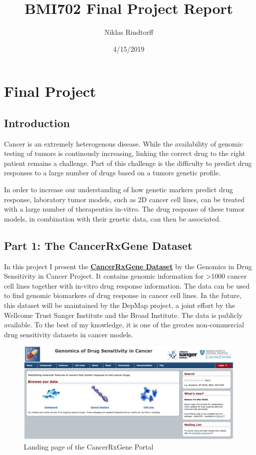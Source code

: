 \documentclass[]{article}
\title{BMI702 Final Project Report}
\author{Niklas Rindtorff}
\date{4/15/2019}
\begin{document}
\maketitle

\hypertarget{final-project}{%
\section{Final Project}\label{final-project}}

\hypertarget{introduction}{%
\subsection{Introduction}\label{introduction}}

Cancer is an extremely heterogenous disease. While the availability of
genomic testing of tumors is continously increasing, linking the correct
drug to the right patient remains a challenge. Part of this challenge is
the difficulty to predict drug responses to a large number of drugs
based on a tumors genetic profile.

In order to increase our understanding of how genetic markers predict
drug response, laboratory tumor models, such as 2D cancer cell lines,
can be treated with a large number of therapeutics in-vitro. The drug
response of these tumor models, in combination with their genetic data,
can then be associated.

\hypertarget{part-1-the-cancerrxgene-dataset}{%
\subsection{Part 1: The CancerRxGene
Dataset}\label{part-1-the-cancerrxgene-dataset}}

In this project I present the
\href{https://www.cancerrxgene.org/translation/Drug/179\#vp}{\textbf{CancerRxGene
Dataset}} by the Genomics in Drug Sensitivity in Cancer Project. It
contains genomic information for \textgreater{}1000 cancer cell lines
together with in-vitro drug response information. The data can be used
to find genomic biomarkers of drug response in cancer cell lines. In the
future, this dataset will be maintained by the DepMap project, a joint
effort by the Wellcome Trust Sanger Institute and the Broad Institute.
The data is publicly available. To the best of my knowledge, it is one
of the greates non-commercial drug sensitivity datasets in cancer
models.

\begin{figure}
\centering
\includegraphics{landing_page.png}
\caption{Landing page of the CancerRxGene Portal}
\end{figure}
\end{document}
